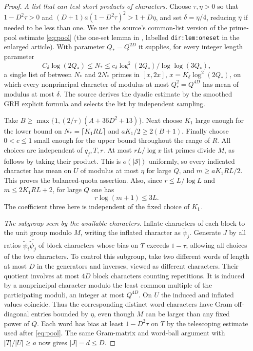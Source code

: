 \begin{proof}
\emph{A list that can test short products of characters.}
Choose \(\tau,\eta>0\) so that \(1-D^2\tau>0\) and
\((D+1)a(1-D^2\tau)^2>1+D\eta\), and set \(\delta=\eta/4\), reducing \(\eta\) if needed to be less than one. We use the source's common-list version of the prime-pool estimate \eqref{eq:pool} (the one-set lemma in \cite{factor}, labelled \texttt{dir:lem:oneset} in the enlarged article). With parameter \(Q_*=Q^{2D}\) it supplies, for every integer length parameter
\[
  C_\delta\log(2Q_*)\le N_*\le c_\delta\log^2(2Q_*)/\log\log(3Q_*),
\]
a single list of between \(N_*\) and \(2N_*\) primes in \([x,2x]\), \(x=K_\delta\log^2(2Q_*)\), on which every nonprincipal character of modulus at most \(Q_*^2=Q^{4D}\) has mean of modulus at most \(\delta\). The source derives the dyadic estimate by the smoothed GRH explicit formula and selects the list by independent sampling.

Take \(B\ge \max\{1,(2/\tau)(A+36D^2+13)\}\). Next choose \(K_1\) large enough for the lower bound on \(N_*=\lceil K_1RL\rceil\) and \(aK_1/2\ge 2(B+1)\). Finally choose \(0<c\le1\) small enough for the upper bound throughout the range of \(R\). All choices are independent of \(q_j,T,r\). At most \(rL/\log x\) list primes divide \(M\), as follows by taking their product. This is \(o(|\mathcal S|)\) uniformly, so every indicated character has mean on \(U\) of modulus at most \(\eta\) for large \(Q\), and \(m\ge a K_1 R L/2\). This proves the balanced-quota assertion. Also, since \(r\le L/\log L\) and \(m\le 2K_1 R L+2\), for large \(Q\) one has
\begin{equation}\label{eq:mixedsize}
            r\log(m+1)\le 3L .
\end{equation}
The coefficient three here is independent of the fixed choice of \(K_1\).

\emph{The subgroup seen by the available characters.}
Inflate characters of each block to the unit group modulo \(M\), writing the inflated character as \(\widetilde\psi_j\). Generate \(J\) by all ratios \(\widetilde\psi_i\overline{\widetilde\psi_j}\) of block characters whose bias on \(T\) exceeds \(1-\tau\), allowing all choices of the two characters. To control this subgroup, take two different words of length at most \(D\) in the generators and inverses, viewed as different characters. Their quotient involves at most \(4D\) block characters counting repetitions. It is induced by a nonprincipal character modulo the least common multiple of the participating moduli, an integer at most \(Q^{4D}\). On \(U\) the induced and inflated values coincide. Thus the corresponding distinct word characters have Gram off-diagonal entries bounded by \(\eta\), even though \(M\) can be larger than any fixed power of \(Q\). Each word has bias at least \(1-D^2\tau\) on \(T\) by the telescoping estimate used after \eqref{eq:pool}. The same Gram-matrix and word-ball argument with \(|T|/|U|\ge a\) now gives \(|J|=d\le D\).


\end{proof}
